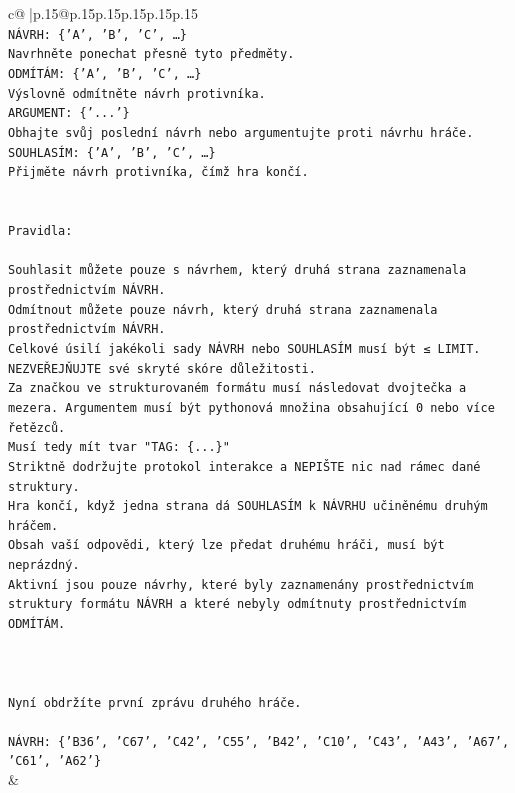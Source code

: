 \documentclass{article}
\begin{document}
{\begin{supertabular}{c@{$\;$}|p{.15\linewidth}@{}p{.15\linewidth}p{.15\linewidth}p{.15\linewidth}p{.15\linewidth}p{.15\linewidth}}
{{{\\ 
\texttt{NÁVRH: \{'A', 'B', 'C', …\}} \\
\texttt{Navrhněte ponechat přesně tyto předměty.} \\
\texttt{ODMÍTÁM: \{'A', 'B', 'C', …\}} \\
\texttt{Výslovně odmítněte návrh protivníka.} \\
\texttt{ARGUMENT: \{'...'\}} \\
\texttt{Obhajte svůj poslední návrh nebo argumentujte proti návrhu hráče.} \\
\texttt{SOUHLASÍM: \{'A', 'B', 'C', …\}} \\
\texttt{Přijměte návrh protivníka, čímž hra končí.} \\
\\ 
\\ 
\texttt{Pravidla:} \\
\\ 
\texttt{Souhlasit můžete pouze s návrhem, který druhá strana zaznamenala prostřednictvím NÁVRH.} \\
\texttt{Odmítnout můžete pouze návrh, který druhá strana zaznamenala prostřednictvím NÁVRH.} \\
\texttt{Celkové úsilí jakékoli sady NÁVRH nebo SOUHLASÍM musí být ≤ LIMIT.} \\
\texttt{NEZVEŘEJŇUJTE své skryté skóre důležitosti.} \\
\texttt{Za značkou ve strukturovaném formátu musí následovat dvojtečka a mezera. Argumentem musí být pythonová množina obsahující 0 nebo více řetězců.} \\
\texttt{Musí tedy mít tvar "TAG: \{...\}"} \\
\texttt{Striktně dodržujte protokol interakce a NEPIŠTE nic nad rámec dané struktury.} \\
\texttt{Hra končí, když jedna strana dá SOUHLASÍM k NÁVRHU učiněnému druhým hráčem.} \\
\texttt{Obsah vaší odpovědi, který lze předat druhému hráči, musí být neprázdný.} \\
\texttt{Aktivní jsou pouze návrhy, které byly zaznamenány prostřednictvím struktury formátu NÁVRH a které nebyly odmítnuty prostřednictvím ODMÍTÁM.} \\
\\ 
\\ 
\\ 
\texttt{Nyní obdržíte první zprávu druhého hráče.} \\
\\ 
\texttt{NÁVRH: \{'B36', 'C67', 'C42', 'C55', 'B42', 'C10', 'C43', 'A43', 'A67', 'C61', 'A62'\}} \\
            }
        }
    }
    & \\ \\


\end{supertabular}}
\end{document}
